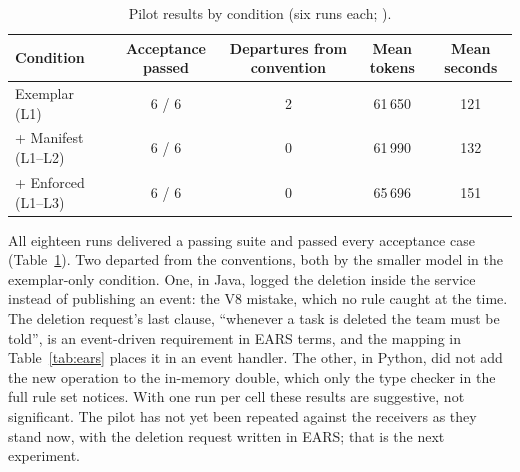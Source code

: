 \begin{table}[t]
  \centering\small
  \caption{Pilot results by condition (six runs each; ).}
  \label{tab:pilot}
  \begin{tabular}{l|c|c|c|c}
    \hline
    \textbf{Condition} & \textbf{Acceptance passed} & \textbf{Departures from convention} & \textbf{Mean tokens} & \textbf{Mean seconds} \\
    \hline\hline
    Exemplar (L1)            & 6 / 6 & 2 & 61\,650 & 121 \\
    \hline
    + Manifest (L1--L2)      & 6 / 6 & 0 & 61\,990 & 132 \\
    \hline
    + Enforced (L1--L3)      & 6 / 6 & 0 & 65\,696 & 151 \\
    \hline
  \end{tabular}
\end{table}

All eighteen runs delivered a passing suite and passed every acceptance case
(Table~\ref{tab:pilot}). Two departed from the conventions, both by the smaller model in the
exemplar-only condition. One, in Java, logged the deletion inside the service instead of
publishing an event: the V8 mistake, which no rule caught at the time. The deletion request's
last clause, ``whenever a task is deleted the team must be told'', is an event-driven requirement
in EARS terms, and the mapping in Table~\ref{tab:ears} places it in an event handler. The other,
in Python, did not add the new operation to the in-memory double, which only the type checker in
the full rule set notices. With one run per cell these results are suggestive, not significant.
The pilot has not yet been repeated against the receivers as they stand now, with the deletion
request written in EARS; that is the next experiment.
